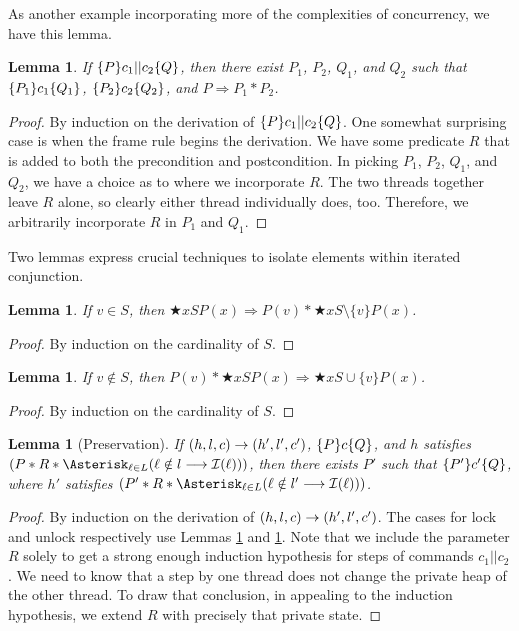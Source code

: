 \documentclass{amsbook}
\newtheorem{lemma}[theorem]{Lemma}
\theoremstyle{definition}
\theoremstyle{remark}
\numberwithin{section}{chapter}
\numberwithin{equation}{chapter}
\begin{document}
As another example incorporating more of the complexities of concurrency, we have this lemma.

\begin{lemma}
  If $\{P\} c_1 || c_2 \{Q\}$, then there exist $P_1$, $P_2$, $Q_1$, and $Q_2$ such that $\{P_1\} c_1 \{Q_1\}$, $\{P_2\} c_2 \{Q_2\}$, and $P \Rightarrow P_1 * P_2$.
\end{lemma}
\begin{proof}
  By induction on the derivation of $\{P\} c_1 || c_2 \{Q\}$.
  One somewhat surprising case is when the frame rule begins the derivation.
  We have some predicate $R$ that is added to both the precondition and postcondition.
  In picking $P_1$, $P_2$, $Q_1$, and $Q_2$, we have a choice as to where we incorporate $R$.
  The two threads together leave $R$ alone, so clearly either thread individually does, too.
  Therefore, we arbitrarily incorporate $R$ in $P_1$ and $Q_1$.
\end{proof}

Two lemmas express crucial techniques to isolate elements within iterated conjunction.

\begin{lemma}\label{chunkslock}
  If $v \in S$, then $\bigstar{x}{S}{P(x)} \Rightarrow P(v) * \bigstar{x}{S \setminus \{v\}}{P(x)}$.
\end{lemma}
\begin{proof}
  By induction on the cardinality of $S$.
\end{proof}

\begin{lemma}\label{chunksunlock}
  If $v \notin S$, then $P(v) * \bigstar{x}{S}{P(x)} \Rightarrow \bigstar{x}{S \cup \{v\}}{P(x)}$.
\end{lemma}
\begin{proof}
  By induction on the cardinality of $S$.
\end{proof}

\begin{lemma}[Preservation]\label{cslpreservation}
  If $(h, l, c) \to (h', l', c')$, $\{P\} c \{Q\}$, and $h$ satisfies $(P * R * \bigstarp{\ell}{L}{\guarded{\ell \notin l}{\mathcal I(\ell)}})$, then there exists $P'$ such that $\{P'\} c' \{Q\}$, where $h'$ satisfies $(P' * R * \bigstarp{\ell}{L}{\guarded{\ell \notin l'}{\mathcal I(\ell)}})$.
\end{lemma}
\begin{proof}
  By induction on the derivation of $(h, l, c) \to (h', l', c')$.
  The cases for lock and unlock respectively use Lemmas \ref{chunkslock} and \ref{chunksunlock}.
  Note that we include the parameter $R$ solely to get a strong enough induction hypothesis for steps of commands $c_1 || c_2$.
  We need to know that a step by one thread does not change the private heap of the other thread.
  To draw that conclusion, in appealing to the induction hypothesis, we extend $R$ with precisely that private state.
\end{proof}
\end{document}
